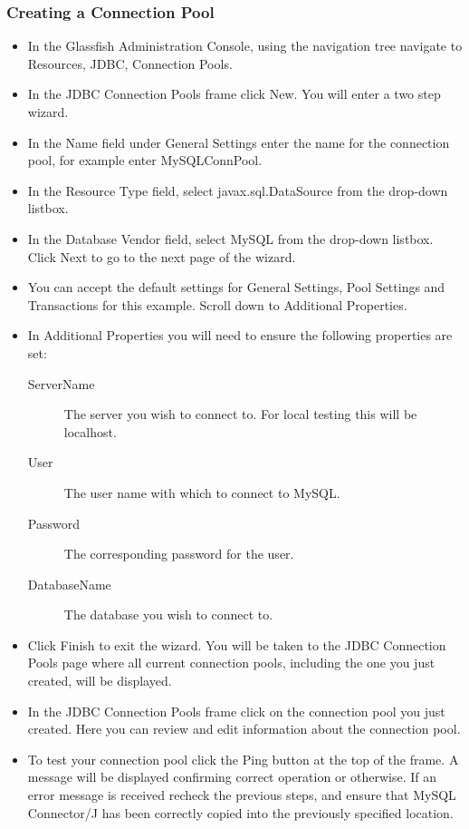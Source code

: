 \subsubsection{Creating a Connection Pool}
\begin{itemize}
  \item In the Glassfish Administration Console, using the navigation tree
  navigate to Resources, JDBC, Connection Pools.
  \item In the JDBC Connection Pools frame click New. You will enter a two step
  wizard.
  \item In the Name field under General Settings enter the name for the
  connection pool, for example enter MySQLConnPool.
  \item In the Resource Type field, select javax.sql.DataSource from the
  drop-down listbox.
  \item In the Database Vendor field, select MySQL from the drop-down listbox.
  Click Next to go to the next page of the wizard.
  \item You can accept the default settings for General Settings, Pool Settings
  and Transactions for this example. Scroll down to Additional Properties.
  \item In Additional Properties you will need to ensure the following
  properties are set:
  \begin{description}
    \item[ServerName] The server you wish to connect to. For local testing this
    will be localhost.
    \item[User] The user name with which to connect to MySQL.
    \item[Password] The corresponding password for the user.
    \item[DatabaseName] The database you wish to connect to.
  \end{description}
  \item Click Finish to exit the wizard. You will be taken to the JDBC
  Connection Pools page where all current connection pools, including the one
  you just created, will be displayed.
  \item In the JDBC Connection Pools frame click on the connection pool you just
  created. Here you can review and edit information about the connection pool.
  \item To test your connection pool click the Ping button at the top of the
  frame. A message will be displayed confirming correct operation or otherwise.
  If an error message is received recheck the previous steps, and ensure that
  MySQL Connector/J has been correctly copied into the previously specified location.
\end{itemize}

